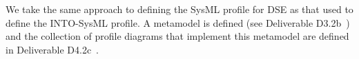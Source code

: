 We take the same approach to defining the SysML profile for DSE as that used to define the INTO-SysML profile.  A metamodel is defined (see Deliverable D3.2b~\cite{INTOCPSD3.2b}) and the collection of profile diagrams that implement this metamodel are defined in Deliverable D4.2c~\cite{INTOCPSD4.2c}.

%
%
%
%
%
%
%
%

